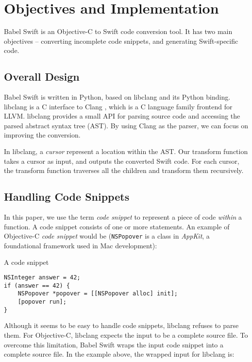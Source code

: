 \documentclass{sfuthesis}
\begin{document}
\chapter{Objectives and Implementation}

Babel Swift is an Objective-C to Swift code conversion tool. It has two main objectives -- converting incomplete code snippets, and generating Swift-specific code.

\section{Overall Design}

Babel Swift is written in Python, based on libclang \cite{libclang} and its Python binding. libclang is a C interface to Clang \cite{clang}, which is a C language family frontend for LLVM. libclang provides a small API for parsing source code and accessing the parsed abstract syntax tree (AST). By using Clang as the parser, we can focus on improving the conversion.

In libclang, a \emph{cursor} represent a location within the AST. Our transform function takes a cursor as input, and outputs the converted Swift code. For each cursor, the transform function traverses all the children and transform them recursively.

\section{Handling Code Snippets}

In this paper, we use the term \emph{code snippet} to represent a piece of code \emph{within} a function. A code snippet consists of one or more statements. An example of Objective-C \emph{code snippet} would be (\texttt{NSPopover} is a class in \emph{AppKit}, a foundational framework used in Mac development):

\begin{listing}
\caption{A code snippet}
\begin{verbatim}
NSInteger answer = 42;
if (answer == 42) {
    NSPopover *popover = [[NSPopover alloc] init];
    [popover run];
}
\end{verbatim}
\end{listing}

Although it seems to be easy to handle code snippets, libclang refuses to parse them. For Objective-C, libclang expects the input to be a complete source file. To overcome this limitation, Babel Swift wraps the input code snippet into a complete source file. In the example above, the wrapped input for libclang is:
\end{document}
